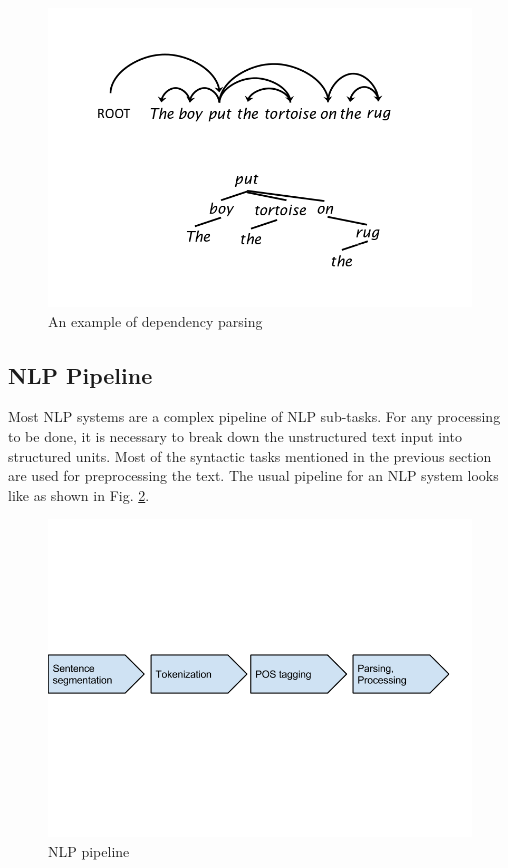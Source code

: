 \begin{itemize}
\begin{figure}
\centering
\includegraphics[scale=0.4]{figures/DependencyParse.png}
\caption{An example of dependency parsing}\label{fig:DepParse}
\end{figure}

\end{itemize}

\subsection{NLP Pipeline}

Most NLP systems are a complex pipeline of NLP sub-tasks. For any processing to be done, it is necessary to break down the unstructured text input into structured units. Most of the syntactic tasks mentioned in the previous section are used for preprocessing the text. The usual pipeline for an NLP system looks like as shown in Fig. \ref{fig:NLPPipe}.

\begin{figure}
\centering
\includegraphics[scale=0.4]{figures/NLPPipeline.png}
\caption{NLP pipeline}\label{fig:NLPPipe}
\end{figure}

